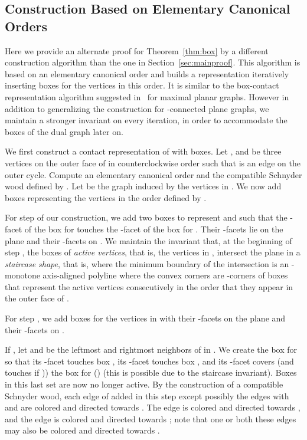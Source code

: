 \documentclass{article}
\newcommand{\df}{\textit}
\begin{document}
\subsection{Construction Based on Elementary Canonical Orders}
\label{sec:alternateproof}

Here we provide an alternate proof for Theorem~\ref{thm:box} by a different construction algorithm
 than the one in Section~\ref{sec:mainproof}.
This algorithm is based on an elementary canonical order and builds a representation iteratively
 inserting boxes for the vertices in this order. It is similar to the box-contact representation algorithm
 suggested in~\cite{BEFHK+12} for maximal planar graphs. However in addition to generalizing the
 construction for -connected plane graphs, we maintain a stronger invariant on every iteration,
 in order to accommodate the boxes of the dual graph later on.





We first construct a contact representation  of  with boxes.
Let ,  and  be three vertices on the outer face of  in counterclockwise order
 such that  is an edge on the outer cycle. Compute an elementary canonical
 order  and the compatible Schnyder wood defined by .
Let  be the graph induced by the vertices in . We now add boxes
 representing the vertices in the order defined by .


For step  of our construction, we add two boxes to represent  and 
 such that the -facet of the box for  touches the -facet of the box for .
Their -facets lie on the plane  and their -facets on .
We maintain the invariant that, at the beginning of step ,
the boxes of \df{active vertices}, that
is, the vertices in ,
intersect the plane  in a \df{staircase shape}, that is, where
the minimum  boundary of the intersection is an -monotone
axis-aligned polyline where the convex corners are -corners
of boxes that represent the active vertices consecutively in the order
that they appear in the outer face of .




For step ,
we add boxes for the vertices in 
with their -facets on the plane  and their -facets on
.

 If , let  and  be the leftmost and rightmost neighbors of  in .
We create the box for  so that
its -facet touches box ,
its -facet touches box , and
its -facet covers (and touches if )) the
 box for  ()
(this is possible due to the staircase invariant).
Boxes in this last set are now no longer
active. By the construction of a compatible Schnyder wood, each edge of  added
in this step except possibly the edges with  and 
are colored  and directed towards . The edge 
is colored  and directed towards , and the edge  is
colored  and directed towards ; note that one or both these edges may
also be colored  and directed towards .
\end{document}
